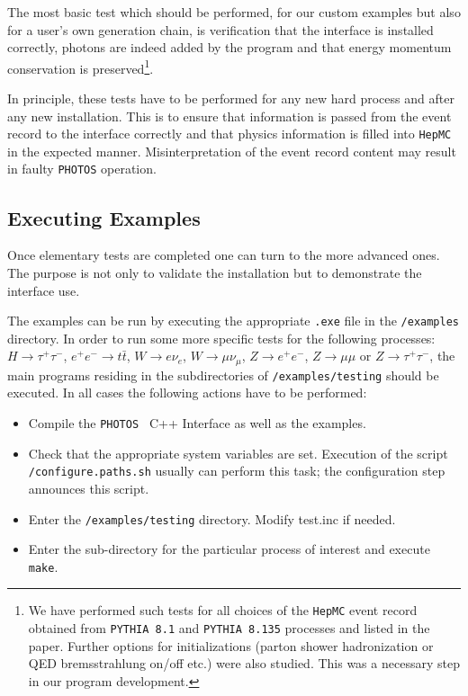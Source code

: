 \documentclass[]{Photos_interface_design}
\begin{document}
The most basic test which should be performed, for our custom examples but also for a user's own generation chain, 
 is verification that the interface is installed correctly, 
photons are indeed added by the program and that energy momentum 
conservation is preserved\footnote{
We have  performed such  tests for all choices of the {\tt HepMC} event record obtained 
from  {\tt PYTHIA 8.1} and {\tt PYTHIA 8.135} processes and 
listed in the paper. Further  options for initializations 
(parton shower hadronization or QED bremsstrahlung on/off etc.) were also studied.
This was a necessary step in our program development.}.

In principle, these tests have to be performed for any new hard 
process and after any new installation. This is to ensure that 
information is passed from the event record to the interface 
correctly and that physics information is filled into {\tt HepMC} 
in the expected manner. Misinterpretation of the event record content may result in 
faulty {\tt PHOTOS} operation.


\subsection{Executing Examples}

Once elementary tests are completed one can turn to the more advanced ones.
The purpose is not only to validate the installation but to demonstrate the
interface use.

The examples can be run by executing the appropriate {\tt .exe} file in the {\tt /examples} directory.
In order to run some more specific tests for the following processes:
$H \rightarrow \tau^+ \tau^-$, $ e^+ e^- \rightarrow t \bar t$,
$W \rightarrow e \nu_e$, $W \rightarrow \mu \nu_\mu$,
$Z \rightarrow e^+ e^-$, $Z \rightarrow \mu \mu$ or $Z \rightarrow \tau^+ \tau^-$,
the main programs residing in the subdirectories of {\tt /examples/testing} should be executed.
In all cases the following actions have to be performed:

\begin{itemize}
  \item Compile the {\tt PHOTOS } C++ Interface as well as the examples. 
 \item  Check that the appropriate system variables are set. Execution of  the script \\
{\tt /configure.paths.sh} usually can perform this task; the configuration step 
announces this script.
  \item Enter the {\tt /examples/testing} directory. Modify test.inc if needed.
  \item Enter the sub-directory for the particular process of interest
and execute {\tt make}.
\end{itemize}
\end{document}
